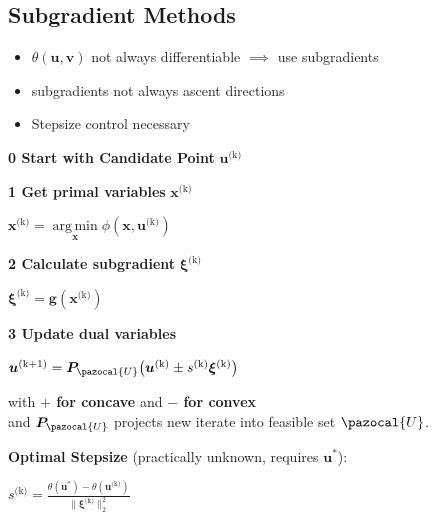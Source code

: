 \documentclass[english]{latex4ei/latex4ei_sheet}
\DeclareMathOperator*{\argmin}{arg\,min}
\begin{document}
\begin{sectionbox}
	\subsection{Subgradient Methods}
	\vspace{0.3em}
	\begin{itemize}
		\item $\theta(\bm{u}, \bm{v})$ not always differentiable $\implies$ use subgradients
		\item subgradients not always ascent directions
		\item Stepsize control necessary
	\end{itemize}
	\vspace{0.5em}
	
	\textbf{0 Start with Candidate Point } $\bm{u}^{\text{(k)}}$ \\
	\vspace{0.5em}
	
	\textbf{1 Get primal variables } $\bm{x}^{\text{(k)}}$ \\
	\begin{center}
		$\bm{x}^{\text{(k)}} = \argmin\limits_{\bm{x}} \phi(\bm{x}, \bm{u}^{\text{(k)}})$
	\end{center}
	\vspace{0.5em}
	
	\textbf{2 Calculate subgradient } $\bm{\xi}^{\text{(k)}}$ \\
	\begin{center}
		$\bm{\xi}^{\text{(k)}} = \bm{g}(\bm{x}^{\text{(k)}})$
	\end{center}
	\vspace{0.5em}
	
	\textbf{3 Update dual variables } \\
	\begin{emphbox}
		\begin{center}
			$\bm{u}^{\text{(k+1)}} = \bm{P}_{\pazocal{U}} \big( \bm{u}^{\text{(k)}} \pm s^{\text{(k)}}\bm{\xi}^{\text{(k)}} \big)$
		\end{center}
		with \textbf{$\bm{+}$ for concave} and \textbf{$\bm{-}$ for convex} \\
		and $\bm{P}_{\pazocal{U}}$ projects new iterate into feasible set $\pazocal{U}$. \\
	\end{emphbox}
	
	\textbf{Optimal Stepsize} (practically unknown, requires $\bm{u}^*$):
	\begin{center}
		$s^{\text{(k)}} = \frac{\theta(\bm{u}^*) - \theta(\bm{u}^{\text{(k)}})}{\| \bm{\xi}^{\text{(k)}} \|_2^2}$
	\end{center}
	\vspace{0.5em}
	

\end{sectionbox}
\end{document}
